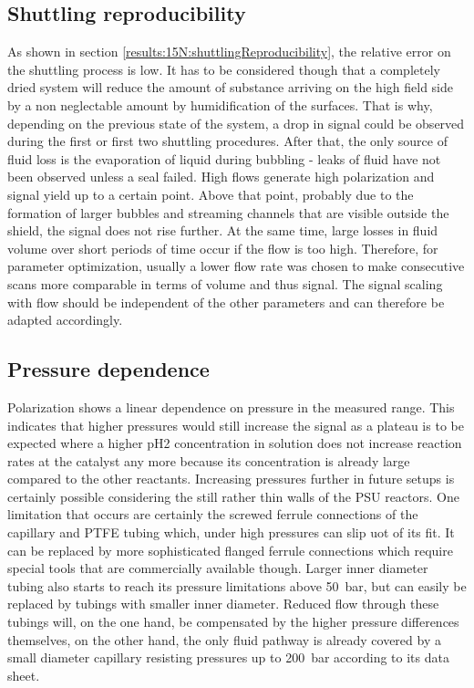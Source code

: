         \subsection{Shuttling reproducibility}
            As shown in section \ref{results:15N:shuttlingReproducibility}, the relative error on the shuttling process is low. It has to be considered though that a completely dried system will reduce the amount of substance arriving on the high field side by a non neglectable amount by humidification of the surfaces. That is why, depending on the previous state of the system, a drop in signal could be observed during the first or first two shuttling procedures. After that, the only source of fluid loss is the evaporation of liquid during bubbling - leaks of fluid have not been observed unless a seal failed. High flows generate high polarization  and signal yield up to a certain point. Above that point, probably due to the formation of larger bubbles and streaming channels that are visible outside the shield, the signal does not rise further. At the same time, large losses in fluid volume over short periods of time occur if the flow is too high. Therefore, for parameter optimization, usually  a lower flow rate was chosen to make consecutive scans more comparable in terms of volume and thus signal. The signal scaling with flow should be independent of the other parameters and can therefore be adapted accordingly.
        \subsection{Pressure dependence}
            Polarization shows a linear dependence on pressure in the measured range. This indicates that higher pressures would still increase the signal as a plateau is to be expected where a higher pH2 concentration in solution does not increase reaction rates at the catalyst any more because its concentration is already large compared to the other reactants. Increasing pressures further in future setups is certainly possible considering the still rather thin walls of the PSU reactors. One limitation that occurs are certainly the screwed ferrule connections of the capillary and PTFE tubing which, under high pressures can slip uot of its fit. It can be replaced by more sophisticated flanged ferrule connections which require special tools that are commercially available though. Larger inner diameter tubing also starts to reach its pressure limitations above \SI{50}{\bar}, but can easily be replaced by tubings with smaller inner diameter. Reduced flow through these tubings will, on the one hand, be compensated by the higher pressure differences themselves, on the other hand, the only fluid pathway is already covered by a small diameter capillary resisting pressures up to \SI{200}{\bar} according to its data sheet.

